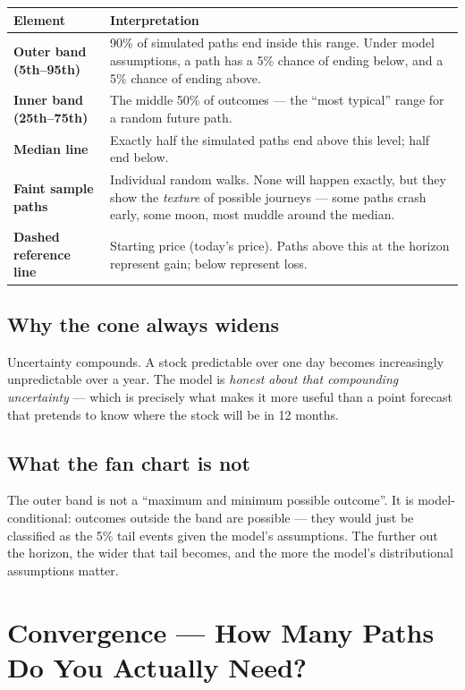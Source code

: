 \documentclass[11pt, a4paper]{article}
\begin{document}
\begin{center}
\begin{tabular}{>{\bfseries}p{3.8cm} p{9.5cm}}
  \toprule
  Element & Interpretation \\
  \midrule
  Outer band (5th–95th) & 90\% of simulated paths end inside this range. Under model assumptions, a path has a 5\% chance of ending below, and a 5\% chance of ending above. \\[4pt]
  Inner band (25th–75th) & The middle 50\% of outcomes — the ``most typical'' range for a random future path. \\[4pt]
  Median line & Exactly half the simulated paths end above this level; half end below. \\[4pt]
  Faint sample paths & Individual random walks. None will happen exactly, but they show the \emph{texture} of possible journeys — some paths crash early, some moon, most muddle around the median. \\[4pt]
  Dashed reference line & Starting price (today's price). Paths above this at the horizon represent gain; below represent loss. \\
  \bottomrule
\end{tabular}
\end{center}

\subsection*{Why the cone always widens}

Uncertainty compounds. A stock predictable over one day becomes increasingly unpredictable over a year. The model is \emph{honest about that compounding uncertainty} — which is precisely what makes it more useful than a point forecast that pretends to know where the stock will be in 12 months.

\subsection*{What the fan chart is not}

The outer band is not a ``maximum and minimum possible outcome''. It is model-conditional: outcomes outside the band are possible — they would just be classified as the 5\% tail events given the model's assumptions. The further out the horizon, the wider that tail becomes, and the more the model's distributional assumptions matter.

\section{Convergence — How Many Paths Do You Actually Need?}
\label{sec:convergence}
\end{document}
